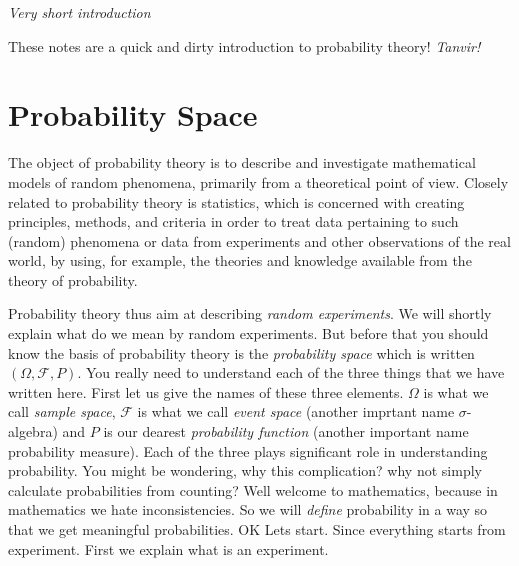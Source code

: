 \documentclass[ 11pt,%
				a4paper,%
				oneside,%
				headinclude,%
				footinclude = true,%
				cleardoublepage = empty,%
				reqno]{scrbook}
\begin{document}


\begin{titlepage}
\vspace{1em}
{\hfill\itshape Very short introduction}
\clearpage
    \vspace*{\fill}\hfill   \parbox{.4\textwidth}{
    \raggedleft
\scriptsize These notes are a quick and dirty introduction to probability theory!  \emph{Tanvir!}
}
\end{titlepage}



\begingroup
\hypersetup{linkcolor=gainsboro!60!black}
\tableofcontents
\endgroup


\frontmatter
{}


\mainmatter



\chapter{Probability Space}

	The object of probability theory is to describe and investigate mathematical models of random phenomena, primarily from a theoretical point of view. Closely related to probability theory is statistics, which is concerned with creating principles, methods, and criteria in order to treat data pertaining to such (random) phenomena or data from experiments and other observations of the real world, by using, for example, the theories and knowledge available from the theory of probability.

	Probability theory thus aim at describing \emph{random experiments}. We will shortly explain what do we mean by random experiments. But before that you should know the basis of probability theory is the \emph{probability space} which is written $(\Omega, \mathcal{F}, P)$. You really need to understand each of the three things that we have written here. First let us give the names of these three elements. $\Omega$ is what we call \emph{sample space}, $\mathcal{F}$ is what we call \emph{event space} (another imprtant name $\sigma$-algebra) and $P$ is our dearest \emph{probability function} (another important name probability measure). Each of the three plays significant role in understanding probability. You might be wondering, why this complication? why not simply calculate probabilities from counting? Well welcome to mathematics, because in mathematics we hate inconsistencies. So we will \emph{define} probability in a way so that we get meaningful probabilities.  OK Lets start. Since everything starts from experiment. First we explain what is an experiment.
\end{document}
